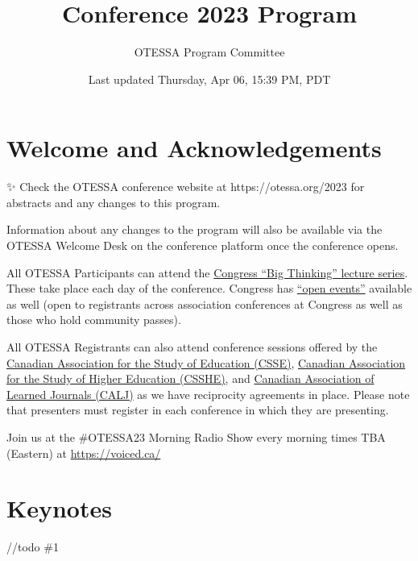 \documentclass[
]{book}
\title{Conference 2023 Program}
\author{OTESSA Program Committee}
\date{Last updated Thursday, Apr 06, 15:39 PM, PDT}
\begin{document}
\maketitle

{
\setcounter{tocdepth}{1}
\tableofcontents
}
\hypertarget{welcome-and-acknowledgements}{%
\chapter*{Welcome and Acknowledgements}\label{welcome-and-acknowledgements}}

\begin{protip}
✨ Check the OTESSA conference website at https://otessa.org/2023 for
abstracts and any changes to this program.

Information about any changes to the program will also be available via
the OTESSA Welcome Desk on the conference platform once the conference
opens.
\end{protip}

All OTESSA Participants can attend the \href{https://www.federationhss.ca/en/congress/congress-2022/open-programming}{Congress ``Big Thinking'' lecture series}. These take place each day of the conference. Congress has \href{https://www.federationhss.ca/en/congress/congress-2022/calendar-open-events}{``open events''} available as well (open to registrants across association conferences at Congress as well as those who hold community passes).

All OTESSA Registrants can also attend conference sessions offered by the \href{https://csse-scee.ca/}{Canadian Association for the Study of Education (CSSE)}, \href{https://csshe-scees.ca/}{Canadian Association for the Study of Higher Education (CSSHE)}, and \href{https://www.calj-acrs.ca/}{Canadian Association of Learned Journals (CALJ)} as we have reciprocity agreements in place. Please note that presenters must register in each conference in which they are presenting.

Join us at the \#OTESSA23 Morning Radio Show every morning times TBA (Eastern) at \url{https://voiced.ca/}

\hypertarget{keynotes}{%
\chapter*{Keynotes}\label{keynotes}}

//todo \#1
\end{document}
